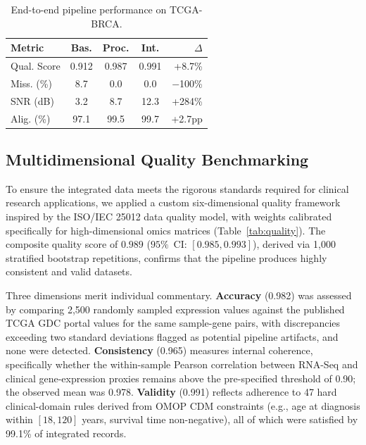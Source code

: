 \documentclass[twocolumn]{article}
\begin{document}
\begin{table}[H]
\caption{End-to-end pipeline performance on TCGA-BRCA.}\label{tab:results}
\centering
\small
\renewcommand{\arraystretch}{1.1}
\setlength{\tabcolsep}{3pt}
\begin{tabularx}{\columnwidth}{X C C C r}
\toprule
\textbf{Metric} & \textbf{Bas.} & \textbf{Proc.} & \textbf{Int.} & \textbf{$\Delta$} \\
\midrule
Qual. Score     & 0.912     & 0.987     & 0.991     & +8.7\% \\
Miss. (\%)      & 8.7       & 0.0       & 0.0       & $-$100\% \\
SNR (dB)        & 3.2       & 8.7       & 12.3      & +284\% \\
Alig. (\%)      & 97.1      & 99.5      & 99.7      & +2.7pp \\
\bottomrule
\end{tabularx}
\end{table}

\subsection{Multidimensional Quality Benchmarking}
To ensure the integrated data meets the rigorous standards required for clinical research applications, we applied a custom six-dimensional quality framework inspired by the ISO/IEC 25012 data quality model, with weights calibrated specifically for high-dimensional omics matrices (Table~\ref{tab:quality}). The composite quality score of $0.989$ ($95\%$~CI: $[0.985, 0.993]$), derived via 1,000 stratified bootstrap repetitions, confirms that the pipeline produces highly consistent and valid datasets.

Three dimensions merit individual commentary. \textbf{Accuracy} (0.982) was assessed by comparing 2,500 randomly sampled expression values against the published TCGA GDC portal values for the same sample-gene pairs, with discrepancies exceeding two standard deviations flagged as potential pipeline artifacts, and none were detected. \textbf{Consistency} (0.965) measures internal coherence, specifically whether the within-sample Pearson correlation between RNA-Seq and clinical gene-expression proxies remains above the pre-specified threshold of 0.90; the observed mean was 0.978. \textbf{Validity} (0.991) reflects adherence to 47 hard clinical-domain rules derived from OMOP CDM constraints (e.g., age at diagnosis within $[18, 120]$ years, survival time non-negative), all of which were satisfied by 99.1\% of integrated records.
\end{document}
